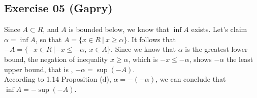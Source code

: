 \subsection*{Exercise 05 (Gapry)}

\begin{flushleft}
Since $A \subset R$, and $A$ is bounded below, we know that $\inf A$ exists.
Let's claim $\alpha = \inf A$, so that $A = \{x \in R\ |\ x \ge \alpha \}$. 
It follows that $-A = \{-x \in R\ | -x \le -\alpha,\ x \in A\}$. 
Since we know that $\alpha$ is the greatest lower bound, 
the negation of inequality $x \ge \alpha$, which is $-x \le -\alpha$, shows $-\alpha$ the least upper bound, that is , $-\alpha = \sup(-A)$. \\

According to 1.14 Proposition (d), $\alpha = -(-\alpha)$, we can conclude that $\inf A = -\sup(-A)$.
\end{flushleft}